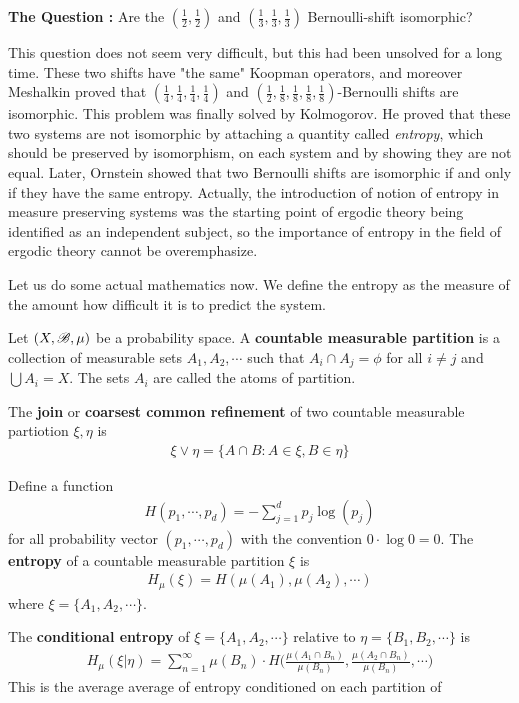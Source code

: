 \documentclass[12pt,a4paper]{report}
\begin{document}
\textbf{The Question :} Are the $(\frac{1}{2}, \frac{1}{2})$ and $(\frac{1}{3},\frac{1}{3},\frac{1}{3})$ Bernoulli-shift isomorphic?
\s

This question does not seem very difficult, but this had been unsolved for a long time. These two shifts have "the same" Koopman operators, and moreover Meshalkin proved that $(\frac{1}{4},\frac{1}{4},\frac{1}{4},\frac{1}{4})$ and $(\frac{1}{2},\frac{1}{8},\frac{1}{8},\frac{1}{8},\frac{1}{8})$-Bernoulli shifts are isomorphic. This problem was finally solved by Kolmogorov. He proved that these two systems are not isomorphic by attaching a quantity called \emph{entropy}, which should be preserved by isomorphism, on each system and by showing they are not equal. Later, Ornstein showed that two Bernoulli shifts are isomorphic if and only if they have the same entropy. Actually, the introduction of notion of entropy in measure preserving systems was the starting point of ergodic theory being identified as an independent subject, so the importance of entropy in the field of ergodic theory cannot be overemphasize.
\s

Let us do some actual mathematics now. We define the entropy as the measure of the amount how difficult it is to predict the system.
\s

 Let $(X,\mathscr{B}, \mu)$ be a probability space. A \textbf{countable measurable partition} is a collection of measurable sets $A_1, A_2, \cdots$ such that $A_i \cap A_j =\phi$ for all $i\neq j$ and $\bigcup A_i = X$. The sets $A_i$ are called the atoms of partition. 

\quad The \textbf{join} or \textbf{coarsest common refinement} of two countable measurable partiotion $\xi, \eta$ is
\begin{align*}
\xi \vee \eta = \{A \cap B : A\in \xi, B \in \eta \}
\end{align*}

\quad Define a function
\begin{align*}
H(p_1, \cdots, p_d) = - \sum_{j=1}^d p_j \log (p_j)
\end{align*}
for all probability vector $(p_1, \cdots, p_d)$ with the convention $0 \cdot \log 0 =0$. The \textbf{entropy} of a countable measurable partition $\xi$ is
\begin{align*}
H_{\mu}(\xi) = H(\mu(A_1), \mu(A_2), \cdots)
\end{align*}
where $\xi = \{A_1, A_2, \cdots \}$.

\quad The \textbf{conditional entropy} of $\xi = \{A_1, A_2, \cdots \}$ relative to $\eta = \{B_1, B_2, \cdots \}$ is 
\begin{align*}
H_{\mu} (\xi | \eta) = \sum_{n=1}^{\infty} \mu(B_n) \cdot H\Big( \frac{\mu(A_1 \cap B_n)}{\mu(B_n)},\frac{\mu(A_2 \cap B_n)}{\mu(B_n)},\cdots \Big)
\end{align*}
This is the average average of entropy conditioned on each partition of 
\s
\end{document}
